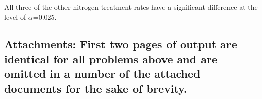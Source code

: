 \documentclass[a4paper,man,natbib]{apa6}
\begin{document}
All three of the other nitrogen treatment rates have a significant difference at the level of $\alpha$=0.025.

\subsection*{Attachments: First two pages of output are identical for all problems above and are omitted in a number of the attached documents for the sake of brevity.}









\end{document}
